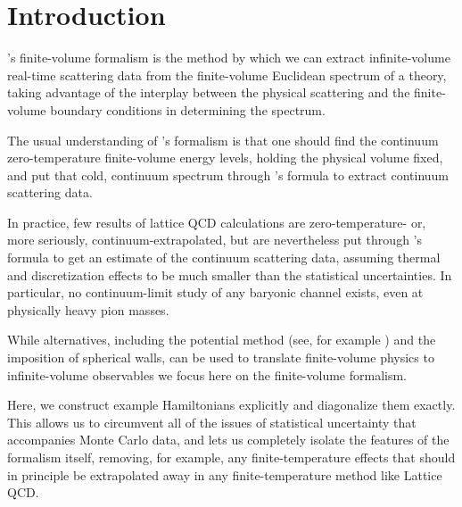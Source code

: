 \section{Introduction}\label{sec:intro}

\Luscher's finite-volume formalism\cite{Hamber198399,luscher:1986I,luscher:1986II,wiese1989,Luscher1991,Luscher1991237} is the method by which we can extract infinite-volume real-time scattering data from the finite-volume Euclidean spectrum of a theory, taking advantage of the interplay between the physical scattering and the finite-volume boundary conditions in determining the spectrum.

The usual understanding of \Luscher's formalism is that one should find the continuum zero-temperature finite-volume energy levels, holding the physical volume fixed, and put that cold, continuum spectrum through \Luscher's formula to extract continuum scattering data.

In practice, few results of lattice QCD calculations are zero-temperature- or, more seriously, continuum-extrapolated, but are nevertheless put through \Luscher's formula to get an estimate of the continuum scattering data, assuming thermal and discretization effects to be much smaller than the statistical uncertainties.
In particular, no continuum-limit study of any baryonic channel exists, even at physically heavy pion masses.

While alternatives, including the potential method (see, for example ) and the imposition of spherical walls\cite{Borasoy:2007vy,Borasoy:2007vi,Lee:2008fa,Epelbaum:2008vj,Epelbaum:2010xt,Elhatisari:2015iga,Elhatisari:2016owd,Elhatisari:2016hby,Klein:2018lqz,Li:2019ldq,Bovermann:2019jbt}, can be used to translate finite-volume physics to infinite-volume observables we focus here on the \Luscher finite-volume formalism.

Here, we construct example Hamiltonians explicitly and diagonalize them exactly.
This allows us to circumvent all of the issues of statistical uncertainty that accompanies Monte Carlo data, and lets us completely isolate the features of the formalism itself, removing, for example, any finite-temperature effects that should in principle be extrapolated away in any finite-temperature method like Lattice QCD.

